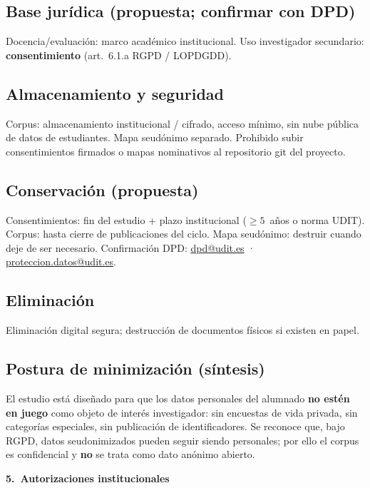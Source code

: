 \documentclass[11pt,a4paper]{scrartcl}
\newcommand{\AnnexTitle}[1]{%
  \clearpage
  \LogoRow
  \begin{center}{\Large\sffamily\bfseries #1}\end{center}
  \vspace{0.4em}
  \noindent{\color{rulegray}\hrule height 0.4pt}
  \vspace{0.5em}
}
\begin{document}
\subsection*{Base jurídica (propuesta; confirmar con DPD)}
Docencia/evaluación: marco académico institucional.
Uso investigador secundario: \textbf{consentimiento} (art.~6.1.a RGPD / LOPDGDD).

\subsection*{Almacenamiento y seguridad}
Corpus: almacenamiento institucional / cifrado, acceso mínimo, sin nube pública
de datos de estudiantes. Mapa seudónimo separado. Prohibido subir consentimientos
firmados o mapas nominativos al repositorio git del proyecto.

\subsection*{Conservación (propuesta)}
Consentimientos: fin del estudio + plazo institucional ($\geq 5$~años o norma UDIT).
Corpus: hasta cierre de publicaciones del ciclo. Mapa seudónimo: destruir cuando
deje de ser necesario. Confirmación DPD:
\href{mailto:dpd@udit.es}{dpd@udit.es} ·
\href{mailto:proteccion.datos@udit.es}{proteccion.datos@udit.es}.

\subsection*{Eliminación}
Eliminación digital segura; destrucción de documentos físicos si existen en papel.

\subsection*{Postura de minimización (síntesis)}
El estudio está diseñado para que los datos personales del alumnado \textbf{no
estén en juego} como objeto de interés investigador: sin encuestas de vida privada,
sin categorías especiales, sin publicación de identificadores. Se reconoce que, bajo
RGPD, datos seudonimizados pueden seguir siendo personales; por ello el corpus
es confidencial y \textbf{no} se trata como dato anónimo abierto.

\AnnexTitle{5.\ Autorizaciones institucionales}
\end{document}
